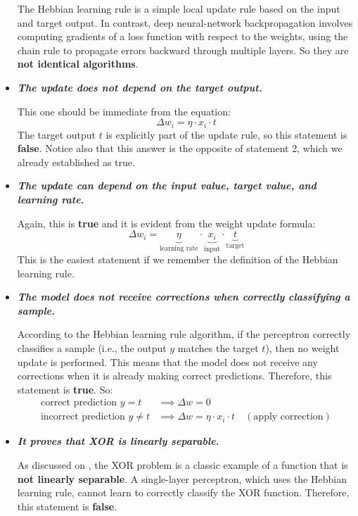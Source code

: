 \begin{itemize}
        The Hebbian learning rule is a simple local update rule based on the input and target output. In contrast, deep neural-network backpropagation involves computing gradients of a loss function with respect to the weights, using the chain rule to propagate errors backward through multiple layers. So they are \textbf{not identical algorithms}.

    \item[\textcolor{Red2}{\faIcon{times}}] \textcolor{Red2}{\textbf{\emph{The update does not depend on the target output.}}}

        This one should be immediate from the equation:
        \begin{equation*}
            \Delta w_i = \eta \cdot x_i \cdot \boxed{t}
        \end{equation*}
        The target output $t$ is explicitly part of the update rule, so this statement is \textbf{false}. Notice also that this answer is the opposite of statement 2, which we already established as true.

    \item[\textcolor{Green3}{\faIcon{check}}] \textcolor{Green3}{\textbf{\emph{The update can depend on the input value, target value, and learning rate.}}}

        Again, this is \textbf{true} and it is evident from the weight update formula:
        \begin{equation*}
            \Delta w_i = \underbrace{\eta}_{\text{learning rate}} \cdot \underbrace{x_i}_{\text{input}} \cdot \underbrace{t}_{\text{target}}
        \end{equation*}
        This is the easiest statement if we remember the definition of the Hebbian learning rule.

    \item[\textcolor{Green3}{\faIcon{check}}] \textcolor{Green3}{\textbf{\emph{The model does not receive corrections when correctly classifying a sample.}}}

        According to the Hebbian learning rule algorithm, if the perceptron correctly classifies a sample (i.e., the output $y$ matches the target $t$), then no weight update is performed. This means that the model does not receive any corrections when it is already making correct predictions. Therefore, this statement is \textbf{true}. So:
        \begin{align*}
            \text{correct prediction } y = t &\implies \Delta w = 0 \\
            \text{incorrect prediction } y \neq t &\implies \Delta w = \eta \cdot x_i \cdot t \quad (\text{apply correction})
        \end{align*}

    \item[\textcolor{Red2}{\faIcon{times}}] \textcolor{Red2}{\textbf{\emph{It proves that XOR is linearly separable.}}}

        As discussed on , the XOR problem is a classic example of a function that is \textbf{not linearly separable}. A single-layer perceptron, which uses the Hebbian learning rule, cannot learn to correctly classify the XOR function. Therefore, this statement is \textbf{false}.
\end{itemize}
